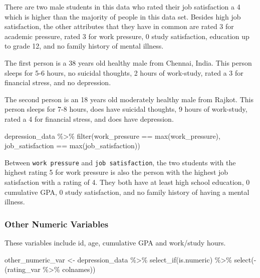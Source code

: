 \documentclass[
  letterpaper,
  DIV=11,
  numbers=noendperiod]{scrartcl}
\newenvironment{Shaded}{\begin{snugshade}}{\end{snugshade}}
\newcommand{\FunctionTok}[1]{\textcolor[rgb]{0.28,0.35,0.67}{#1}}
\newcommand{\NormalTok}[1]{\textcolor[rgb]{0.00,0.23,0.31}{#1}}
\newcommand{\OtherTok}[1]{\textcolor[rgb]{0.00,0.23,0.31}{#1}}
\newcommand{\SpecialCharTok}[1]{\textcolor[rgb]{0.37,0.37,0.37}{#1}}
\begin{document}
There are two male students in this data who rated their job
satisfaction a 4 which is higher than the majority of people in this
data set. Besides high job satisfaction, the other attributes that they
have in common are rated 3 for academic pressure, rated 3 for work
pressure, 0 study satisfaction, education up to grade 12, and no family
history of mental illness.

The first person is a 38 years old healthy male from Chennai, India.
This person sleeps for 5-6 hours, no suicidal thoughts, 2 hours of
work-study, rated a 3 for financial stress, and no depression.

The second person is an 18 years old moderately healthy male from
Rajkot. This person sleeps for 7-8 hours, does have suicidal thoughts, 9
hours of work-study, rated a 4 for financial stress, and does have
depression.

\begin{Shaded}
\begin{Highlighting}[numbers=left,,]
\NormalTok{depression\_data }\SpecialCharTok{\%\textgreater{}\%} 
  \FunctionTok{filter}\NormalTok{(work\_pressure }\SpecialCharTok{==} \FunctionTok{max}\NormalTok{(work\_pressure), }
\NormalTok{         job\_satisfaction }\SpecialCharTok{==} \FunctionTok{max}\NormalTok{(job\_satisfaction))}
\end{Highlighting}
\end{Shaded}

Between \texttt{work\ pressure} and \texttt{job\ satisfaction}, the two
students with the highest rating 5 for work pressure is also the person
with the highest job satisfaction with a rating of 4. They both have at
least high school education, 0 cumulative GPA, 0 study satisfaction, and
no family history of having a mental illness.

\subsubsection{Other Numeric Variables}\label{other-numeric-variables}

These variables include id, age, cumulative GPA and work/study hours.

\begin{Shaded}
\begin{Highlighting}[numbers=left,,]
\NormalTok{other\_numeric\_var }\OtherTok{\textless{}{-}}\NormalTok{ depression\_data }\SpecialCharTok{\%\textgreater{}\%} \FunctionTok{select\_if}\NormalTok{(is.numeric) }\SpecialCharTok{\%\textgreater{}\%} \FunctionTok{select}\NormalTok{(}\SpecialCharTok{{-}}\NormalTok{(rating\_var }\SpecialCharTok{\%\textgreater{}\%}\NormalTok{ colnames))}
\end{Highlighting}
\end{Shaded}
\end{document}
